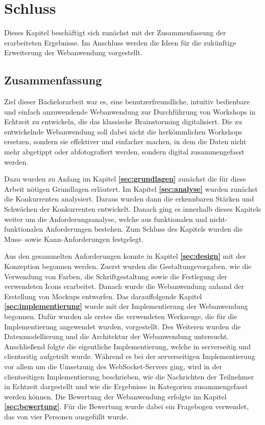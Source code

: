 \chapter{Schluss}
\label{sec:schluss}
Dieses Kapitel beschäftigt sich zunächst mit der Zusammenfassung der erarbeiteten Ergebnisse. Im Anschluss werden die Ideen für die zukünftige Erweiterung der Webanwendung vorgestellt.

\section{Zusammenfassung}
\label{sec:Zusammenfassung}
Ziel dieser Bachelorarbeit war es, eine benutzerfreundliche, intuitiv bedienbare und einfach anzuwendende Webanwendung zur Durchführung von Workshops in Echtzeit zu entwickeln, die das klassische Brainstorming digitalisiert. Die zu entwickelnde Webanwendung soll dabei nicht die herkömmlichen Workshops ersetzen, sondern sie effektiver und einfacher  machen, in dem die Daten nicht mehr abgetippt oder abfotografiert werden, sondern digital zusammengefasst werden.\bigskip

Dazu wurden zu Anfang im Kapitel \textbf{\ref{sec:grundlagen}} zunächst die für diese Arbeit nötigen Grundlagen erläutert. Im Kapitel \textbf{\ref{sec:analyse}} wurden zunächst die Konkurrenten analysiert. Daraus wurden dann die erkennbaren Stärken und Schwächen der Konkurrenten entwickelt. Danach ging es innerhalb dieses Kapitels weiter um die Anforderungsanalyse, welche aus funktionalen und nicht-funktionalen Anforderungen bestehen. Zum Schluss des Kapitels wurden die Muss- sowie Kann-Anforderungen festgelegt.\bigskip

Aus den gesammelten Anforderungen konnte in Kapitel \textbf{\ref{sec:design}} mit der Konzeption begonnen werden. Zuerst wurden die Gestaltungsvorgaben, wie die Verwendung von Farben, die Schriftgestaltung sowie die Festlegung der verwendeten Icons erarbeitet. Danach wurde die Webanwendung anhand der Erstellung von Mockups entworfen. Das darauffolgende Kapitel \textbf{\ref{sec:implementierung}} wurde mit der Implementierung der Webanwendung begonnen. Dafür wurden als erstes die verwendeten Werkzeuge, die für die Implementierung angewendet wurden, vorgestellt. Des Weiteren wurden die Datenmodellierung und die Architektur der Webanwendung untersucht. Anschließend folgte die eigentliche Implementierung, welche in serverseitig und clientseitig aufgeteilt wurde. Während es bei der serverseitigen Implementierung vor allem um die Umsetzung des WebSocket-Servers ging, wird in der clientseitigen Implementierung beschrieben, wie die Nachrichten der Teilnehmer in Echtzeit dargestellt und wie die Ergebnisse in Kategorien zusammengefasst werden können. Die Bewertung der Webanwendung erfolgte im Kapitel \textbf{\ref{sec:bewertung}}. Für die Bewertung wurde dabei ein Fragebogen verwendet, das von vier Personen ausgefüllt wurde. 

